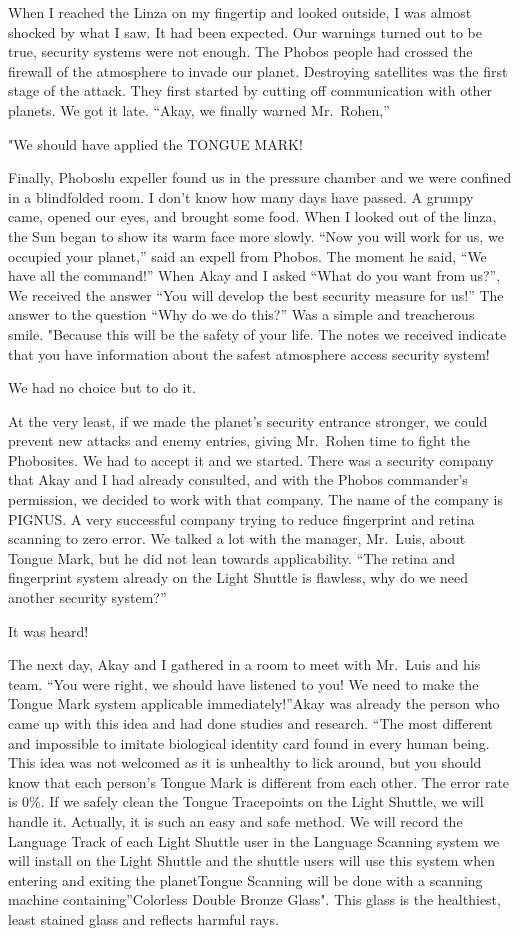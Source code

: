 \documentclass[]{book}
\begin{document}
When I reached the Linza on my fingertip and looked outside, I was almost shocked by what I saw. It had been expected. Our warnings turned out to be true, security systems were not enough. The Phobos people had crossed the firewall of the atmosphere to invade our planet. Destroying satellites was the first stage of the attack. They first started by cutting off communication with other planets. We got it late. ``Akay, we finally warned Mr.~Rohen,''

"We should have applied the TONGUE MARK!

Finally, Phoboslu expeller found us in the pressure chamber and we were confined in a blindfolded room. I don't know how many days have passed. A grumpy came, opened our eyes, and brought some food. When I looked out of the linza, the Sun began to show its warm face more slowly. ``Now you will work for us, we occupied your planet,'' said an expell from Phobos. The moment he said, ``We have all the command!'' When Akay and I asked ``What do you want from us?'', We received the answer ``You will develop the best security measure for us!'' The answer to the question ``Why do we do this?'' Was a simple and treacherous smile. "Because this will be the safety of your life. The notes we received indicate that you have information about the safest atmosphere access security system!

We had no choice but to do it.

At the very least, if we made the planet's security entrance stronger, we could prevent new attacks and enemy entries, giving Mr.~Rohen time to fight the Phobosites. We had to accept it and we started. There was a security company that Akay and I had already consulted, and with the Phobos commander's permission, we decided to work with that company. The name of the company is PIGNUS. A very successful company trying to reduce fingerprint and retina scanning to zero error. We talked a lot with the manager, Mr.~Luis, about Tongue Mark, but he did not lean towards applicability. ``The retina and fingerprint system already on the Light Shuttle is flawless, why do we need another security system?''

It was heard!

The next day, Akay and I gathered in a room to meet with Mr.~Luis and his team. ``You were right, we should have listened to you! We need to make the Tongue Mark system applicable immediately!''Akay was already the person who came up with this idea and had done studies and research. ``The most different and impossible to imitate biological identity card found in every human being. This idea was not welcomed as it is unhealthy to lick around, but you should know that each person's Tongue Mark is different from each other. The error rate is 0\%. If we safely clean the Tongue Tracepoints on the Light Shuttle, we will handle it. Actually, it is such an easy and safe method. We will record the Language Track of each Light Shuttle user in the Language Scanning system we will install on the Light Shuttle and the shuttle users will use this system when entering and exiting the planetTongue Scanning will be done with a scanning machine containing''Colorless Double Bronze Glass". This glass is the healthiest, least stained glass and reflects harmful rays.
\end{document}
